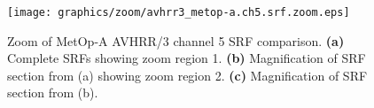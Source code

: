 \begin{figure}[htp]
  \centering
  \texttt{[image: graphics/zoom/avhrr3\_metop-a.ch5.srf.zoom.eps]}
  \caption{Zoom of MetOp-A AVHRR/3 channel 5 SRF comparison. \textbf{(a)} Complete SRFs showing zoom region 1. \textbf{(b)} Magnification of SRF section from (a) showing zoom region 2.  \textbf{(c)} Magnification of SRF section from (b).}
  \label{fig:avhrr3_metop-a.ch5.srf.zoom}
\end{figure}

